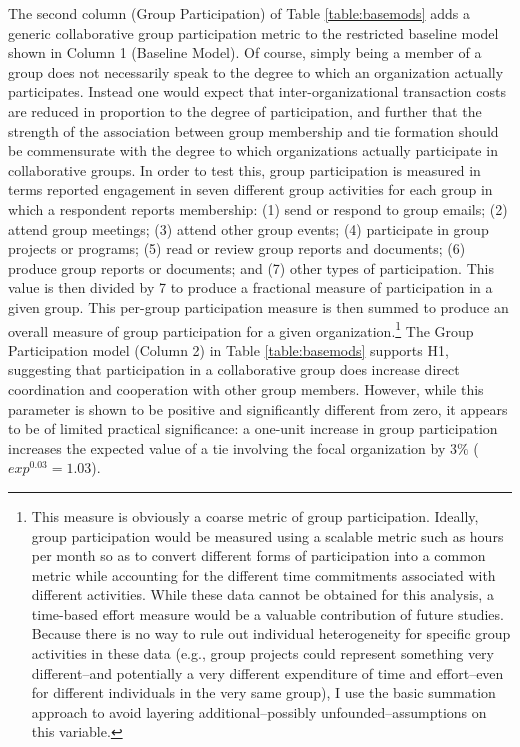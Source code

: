 \documentclass[12pt,a4paper,titlepage]{article}
\begin{document}
The second column (Group Participation) of Table \ref{table:basemods} adds a generic collaborative group participation metric to the restricted baseline model shown in Column 1 (Baseline Model). Of course, simply being a member of a group does not necessarily speak to the degree to which an organization actually participates. Instead one would expect that inter-organizational transaction costs are reduced in proportion to the degree of participation, and further that the strength of the association between group membership and tie formation should be commensurate with the degree to which organizations actually participate in collaborative groups. In order to test this, group participation is measured in terms reported engagement in seven different group activities for each group in which a respondent reports membership: (1) send or respond to group emails; (2) attend group meetings; (3) attend other group events; (4) participate in group projects or programs; (5) read or review group reports and documents; (6) produce group reports or documents; and (7) other types of participation. This value is then divided by 7 to produce a fractional measure of participation in a given group. This per-group participation measure is then summed to produce an overall measure of group participation for a given organization.\footnote{This measure is obviously a coarse metric of group participation. Ideally, group participation would be measured using a scalable metric such as hours per month so as to convert different forms of participation into a common metric while accounting for the different time commitments associated with different activities. While these data cannot be obtained for this analysis, a time-based effort measure would be a valuable contribution of future studies. Because there is no way to rule out individual heterogeneity for specific group activities in these data (e.g., group projects could represent something very different--and potentially a very different expenditure of time and effort--even for different individuals in the very same group), I use the basic summation approach to avoid layering additional--possibly unfounded--assumptions on this variable.} The Group Participation model (Column 2) in Table \ref{table:basemods} supports H1, suggesting that participation in a collaborative group does increase direct coordination and cooperation with other group members. However, while this parameter is shown to be positive and significantly different from zero, it appears to be of limited practical significance: a one-unit increase in group participation increases the expected value of a tie involving the focal organization by $3\%$ ($exp^{0.03} = 1.03$). 
\end{document}
